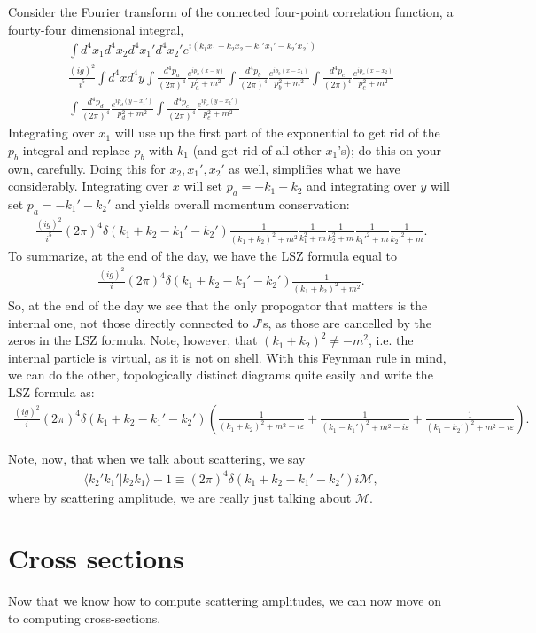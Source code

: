 \documentclass{../mathnotes}
\begin{document}
Consider the Fourier transform of the connected four-point correlation function, a fourty-four dimensional integral,
\begin{align*}
    \int d^4x_1d^4x_2d^4x_1'd^4x_2'e^{i(k_1x_1+k_2x_2-k_1'x_1'-k_2'x_2')}\\
    \frac{(ig)^2}{i^5}\int d^4xd^4y\int \frac{d^4p_a}{(2\pi)^4}\frac{e^{ip_a(x-y)}}{p_a^2+m^2}
    \int \frac{d^4p_b}{(2\pi)^4}\frac{e^{ip_b(x-x_1)}}{p_b^2+m^2}\int \frac{d^4p_c}{(2\pi)^4}\frac{e^{ip_c(x-x_2)}}{p_c^2+m^2}\\
    \int \frac{d^4p_d}{(2\pi)^4}\frac{e^{ip_d(y-x_1')}}{p_d^2+m^2}    \int \frac{d^4p_e}{(2\pi)^4}\frac{e^{ip_e(y-x_2')}}{p_e^2+m^2}
\end{align*}
Integrating over $x_1$ will use up the first part of the exponential to get rid of the $p_b$ integral and replace $p_b$ with $k_1$ (and
get rid of all other $x_1$'s); do this on your own, carefully. Doing this for $x_2,x_1',x_2'$ as well, simplifies what we have considerably.
Integrating over $x$ will set $p_a=-k_1-k_2$ and integrating over $y$ will set $p_a=-k_1'-k_2'$ and yields overall momentum conservation:
\begin{align*}
    \frac{(ig)^2}{i^5}(2\pi)^4\delta(k_1+k_2-k_1'-k_2')\frac{1}{(k_1+k_2)^2+m^2}\frac{1}{k_1^2+m}\frac{1}{k_2^2+m}\frac{1}{k_1'^2+m}\frac{1}{k_2'^2+m}.
\end{align*}
To summarize, at the end of the day, we have the LSZ formula equal to
\begin{align*}
    \frac{(ig)^2}{i}(2\pi)^4\delta(k_1+k_2-k_1'-k_2')\frac{1}{(k_1+k_2)^2+m^2}.
\end{align*}
So, at the end of the day we see that the only propogator that matters is the internal one, not those directly connected to $J$'s, as those are
cancelled by the zeros in the LSZ formula. Note, however, that $(k_1+k_2)^2\neq -m^2$, i.e. the internal particle is virtual, as it is not
on shell.
With this Feynman rule in mind, we can do the other, topologically distinct diagrams quite easily and write the LSZ formula as:
\begin{align*}
    \frac{(ig)^2}{i}(2\pi)^4\delta(k_1+k_2-k_1'-k_2')
    \left(\frac{1}{(k_1+k_2)^2+m^2-i\varepsilon}+\frac{1}{(k_1-k_1')^2+m^2-i\varepsilon}+\frac{1}{(k_1-k_2')^2+m^2-i\varepsilon}\right).
\end{align*}

Note, now, that when we talk about scattering, we say
\begin{align*}
    \langle k_2'k_1'|k_2k_1\rangle-1\equiv(2\pi)^4\delta(k_1+k_2-k_1'-k_2')i\mathcal{M},
\end{align*}
where by scattering amplitude, we are really just talking about $\mathcal{M}$.

\section*{Cross sections}

Now that we know how to compute scattering amplitudes, we can now move on to computing cross-sections.
\end{document}
